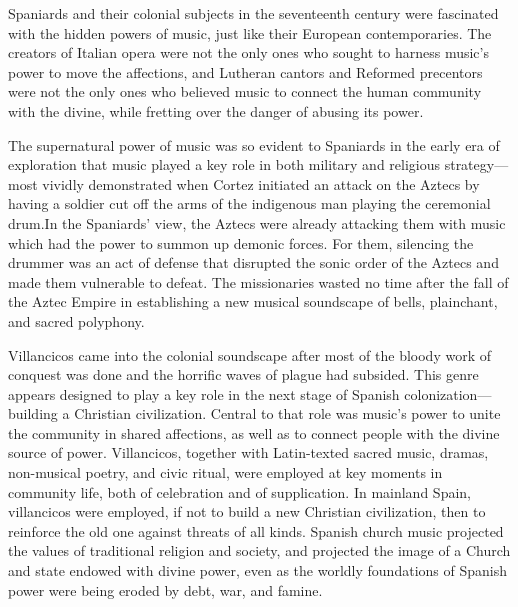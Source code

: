 

\label{ch:sacred-power}

Spaniards and their colonial subjects in the seventeenth century were fascinated with the hidden powers of music, just like their European contemporaries.
The creators of Italian opera were not the only ones who sought to harness music's power to move the affections, and Lutheran cantors and Reformed precentors were not the only ones who believed music to connect the human community with the divine, while fretting over the danger of abusing its power.\citXXX{}

The supernatural power of music was so evident to Spaniards in the early era of exploration that music played a key role in both military and religious strategy---most vividly demonstrated when Cortez initiated an attack on the Aztecs by having a soldier cut off the arms of the indigenous man playing the ceremonial  drum.
In the Spaniards' view, the Aztecs were already attacking them with music which had the power to summon up demonic forces. 
For them, silencing the drummer was an act of defense that disrupted the sonic order of the Aztecs and made them vulnerable to defeat.
The missionaries wasted no time after the fall of the Aztec Empire in establishing a new musical soundscape of bells, plainchant, and sacred polyphony.\citXXX{}

Villancicos came into the colonial soundscape after most of the bloody work of conquest was done and the horrific waves of plague had subsided.
This genre appears designed to play a key role in the next stage of Spanish colonization---building a Christian civilization.
Central to that role was music's power to unite the community in shared affections, as well as to connect people with the divine source of power.
Villancicos, together with Latin-texted sacred music, dramas, non-musical poetry, and civic ritual, were employed at key moments in community life, both of celebration and of supplication.\citXXX{}
In mainland Spain, villancicos were employed, if not to build a new Christian civilization, then to reinforce the old one against threats of all kinds.
Spanish church music projected the values of traditional religion and society, and projected the image of a Church and state endowed with divine power, even as the worldly foundations of Spanish power were being eroded by debt, war, and famine.\citXXX{}

